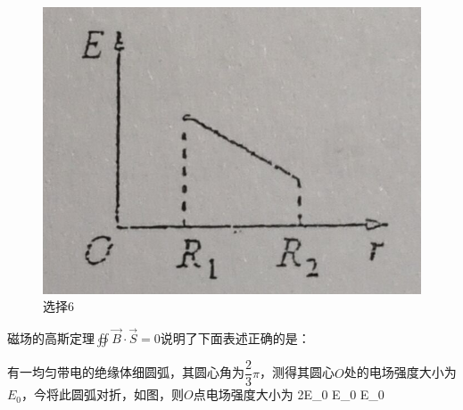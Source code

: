 \begin{figure}[!h]
{{\begin{minipage}[t]{\linewidth}
			\includegraphics[width=\textwidth]{2012_4c.jpg}
	\end{minipage}}}
	{}
	\caption{选择6}
\end{figure}

磁场的高斯定理$\oiint\vec{B}\cdot\vec{S}=0$说明了下面表述正确的是：

有一均匀带电的绝缘体细圆弧，其圆心角为$\dfrac{2}{3}\pi$，测得其圆心$O$处的电场强度大小为$E_0$，今将此圆弧对折，如图，则$O$点电场强度大小为
{2E_0}
{E_0}
{E_0}        

